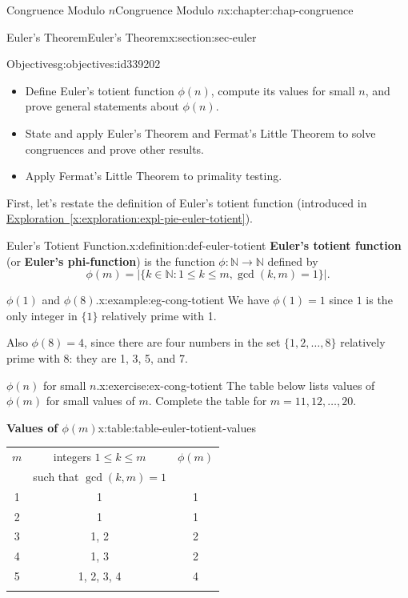 \documentclass[oneside,10pt,]{book}
\newcommand{\tabularfont}{\relax}
\newcommand{\xreffont}{\relax}
\newcommand{\terminology}[1]{\textbf{#1}}
\numberwithin{equation}{section}
\newcommand{\hrulemedium}{\noalign{\hrule height 0.07em}}
\begin{document}
\begin{chapterptx}{Congruence Modulo \(n\)}{}{Congruence Modulo \(n\)}{}{}{x:chapter:chap-congruence}
\begin{sectionptx}{Euler's Theorem}{}{Euler's Theorem}{}{}{x:section:sec-euler}
\begin{objectives}{Objectives}{g:objectives:id339202}
%
\begin{itemize}[label=\textbullet]
\item{}Define Euler's totient function \(\phi(n)\), compute its values for small \(n\), and prove general statements about \(\phi(n)\).%
\item{}State and apply Euler's Theorem and Fermat's Little Theorem to solve congruences and prove other results.%
\item{}Apply Fermat's Little Theorem to primality testing.%
\end{itemize}
\end{objectives}
First, let's restate the definition of Euler's totient function (introduced in \hyperref[x:exploration:expl-pie-euler-totient]{Exploration~{\xreffont\ref{x:exploration:expl-pie-euler-totient}}}).%
\begin{definition}{Euler's Totient Function.}{x:definition:def-euler-totient}%
\terminology{Euler's totient function} (or \terminology{Euler's phi-function}) is the function \(\phi: \mathbb{N} \rightarrow \mathbb{N}\) defined by%
\begin{equation*}
\phi(m) = \bigl|\{k \in \mathbb{N} : 1 \leq k \leq m, \gcd(k,m) = 1\}\bigr|\text{.}
\end{equation*}
\label{g:notation:id253216}%
\end{definition}
\begin{example}{\(\phi(1)\) and \(\phi(8)\).}{x:example:eg-cong-totient}%
We have \(\phi(1) = 1\) since \(1\) is the only integer in \(\{1\}\) relatively prime with 1.%
\par
Also \(\phi(8) = 4\), since there are four numbers in the set \(\{1,2,\ldots,8\}\) relatively prime with 8: they are 1, 3, 5, and 7.%
\end{example}
\begin{inlineexercise}{\(\phi(n)\) for small \(n\).}{x:exercise:ex-cong-totient}%
The table below lists values of \(\phi(m)\) for small values of \(m\). Complete the table for \(m = 11, 12, \ldots, 20\).%
\begin{tableptx}{\textbf{Values of \(\phi(m)\)}}{x:table:table-euler-totient-values}{}%
\centering
{\tabularfont%
\begin{tabular}{ccc}
\(m\)&integers \(1 \leq k \leq m\)&\(\phi(m)\)\tabularnewline[0pt]
&such that \(\gcd(k,m)=1\)&\tabularnewline\hrulemedium
1&1&1\tabularnewline[0pt]
2&1&1\tabularnewline[0pt]
3&1, 2&2\tabularnewline[0pt]
4&1, 3&2\tabularnewline[0pt]
5&1, 2, 3, 4&4\tabularnewline\hrulemedium

\end{tabular}}
\end{tableptx}
\end{inlineexercise}
\end{sectionptx}
\end{chapterptx}
\end{document}
